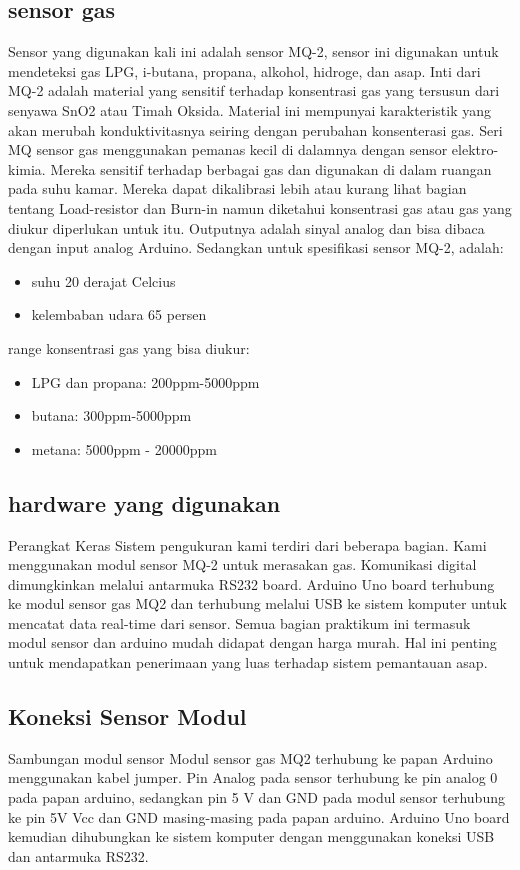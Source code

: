 \subsection{sensor gas}
Sensor yang digunakan kali ini adalah sensor MQ-2, sensor ini digunakan untuk mendeteksi gas LPG, i-butana, propana, alkohol, hidroge, dan asap. Inti dari MQ-2 adalah material yang sensitif terhadap konsentrasi gas yang tersusun dari senyawa SnO2 atau Timah Oksida. Material ini mempunyai karakteristik yang akan merubah konduktivitasnya seiring dengan perubahan konsenterasi gas.
Seri MQ sensor gas menggunakan pemanas kecil di dalamnya dengan sensor elektro-kimia. Mereka sensitif terhadap berbagai gas dan digunakan di dalam ruangan pada suhu kamar.
Mereka dapat dikalibrasi lebih atau kurang lihat bagian tentang Load-resistor dan Burn-in namun diketahui konsentrasi gas atau gas yang diukur diperlukan untuk itu.
Outputnya adalah sinyal analog dan bisa dibaca dengan input analog Arduino.
Sedangkan untuk spesifikasi sensor MQ-2, adalah:
\begin{itemize}
\item suhu 20 derajat Celcius
\item kelembaban udara 65 persen
\end{itemize}
range konsentrasi gas yang bisa diukur:
\begin{itemize}
\item LPG dan propana: 200ppm-5000ppm
\item butana: 300ppm-5000ppm
\item metana: 5000ppm - 20000ppm
\end{itemize}

\subsection{hardware yang digunakan}
Perangkat Keras Sistem pengukuran kami terdiri dari beberapa bagian. Kami menggunakan modul sensor MQ-2 untuk merasakan gas. Komunikasi digital dimungkinkan melalui antarmuka RS232 board. Arduino Uno board terhubung ke modul sensor gas MQ2 dan terhubung melalui USB ke sistem komputer untuk mencatat data real-time dari sensor. Semua bagian praktikum ini termasuk modul sensor dan arduino mudah didapat dengan harga murah. Hal ini penting untuk mendapatkan penerimaan yang luas terhadap sistem pemantauan asap.
	
\subsection{Koneksi Sensor Modul}
Sambungan modul sensor Modul sensor gas MQ2 terhubung ke papan Arduino menggunakan kabel jumper. Pin Analog pada sensor terhubung ke pin analog 0 pada papan arduino, sedangkan pin 5 V dan GND pada modul sensor terhubung ke pin 5V Vcc dan GND masing-masing pada papan arduino. Arduino Uno board kemudian dihubungkan ke sistem komputer dengan menggunakan koneksi USB dan antarmuka RS232.

